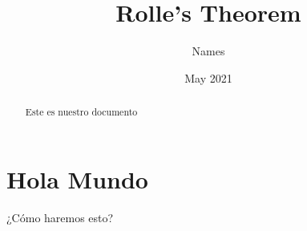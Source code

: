 \documentclass{article}
\title{Rolle's Theorem}
\author{Names}
\date{May 2021}
\begin{document}
    \maketitle

    \begin{abstract}
        Este es nuestro documento
    \end{abstract}

    \section*{Hola Mundo}
    ¿Cómo haremos esto? 
\end{document}
